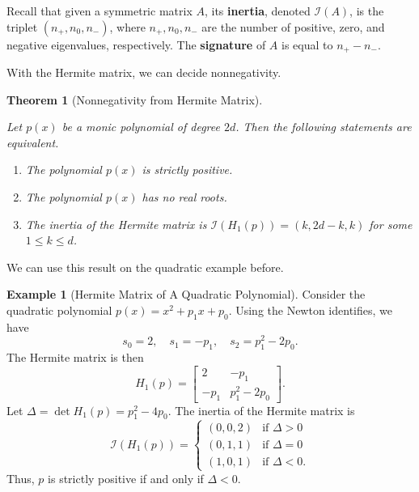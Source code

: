 \documentclass[
]{book}
\newtheorem{theorem}{Theorem}[chapter]
\theoremstyle{definition}
\theoremstyle{definition}
\newtheorem{example}{Example}[chapter]
\theoremstyle{definition}
\theoremstyle{definition}
\theoremstyle{remark}
\begin{document}
Recall that given a symmetric matrix \(A\), its \textbf{inertia}, denoted \(\mathcal{I}(A)\), is the triplet \((n_+, n_0, n_{-})\), where \(n_+,n_0, n_-\) are the number of positive, zero, and negative eigenvalues, respectively. The \textbf{signature} of \(A\) is equal to \(n_+ - n_-\).

With the Hermite matrix, we can decide nonnegativity.

\begin{theorem}[Nonnegativity from Hermite Matrix]
\protect\hypertarget{thm:NonnegativityHermite}{}\label{thm:NonnegativityHermite}

Let \(p(x)\) be a monic polynomial of degree \(2d\). Then the following statements are equivalent.

\begin{enumerate}
\def\labelenumi{\arabic{enumi}.}
\item
  The polynomial \(p(x)\) is strictly positive.
\item
  The polynomial \(p(x)\) has no real roots.
\item
  The inertia of the Hermite matrix is \(\mathcal{I}(H_1(p)) = (k, 2d-k, k)\) for some \(1 \leq k \leq d\).
\end{enumerate}

\end{theorem}

We can use this result on the quadratic example before.

\begin{example}[Hermite Matrix of A Quadratic Polynomial]
\protect\hypertarget{exm:HermiteQuadratic}{}\label{exm:HermiteQuadratic}Consider the quadratic polynomial \(p(x) = x^2 + p_1 x + p_0\). Using the Newton identifies, we have
\[
s_0 = 2, \quad s_1 = -p_1, \quad s_2 = p_1^2 - 2p_0.
\]
The Hermite matrix is then
\[
H_1(p) = \begin{bmatrix} 2 & - p_1 \\ -p_1 & p_1^2 - 2 p_0 \end{bmatrix}.
\]
Let \(\Delta = \det H_1(p) = p_1^2 - 4p_0\). The inertia of the Hermite matrix is
\[
\mathcal{I}(H_1(p)) = \begin{cases}
(0,0,2) & \text{if } \Delta > 0 \\
(0,1,1) & \text{if } \Delta = 0 \\
(1,0,1) & \text{if } \Delta < 0.
\end{cases}
\]
Thus, \(p\) is strictly positive if and only if \(\Delta < 0\).
\end{example}
\end{document}
